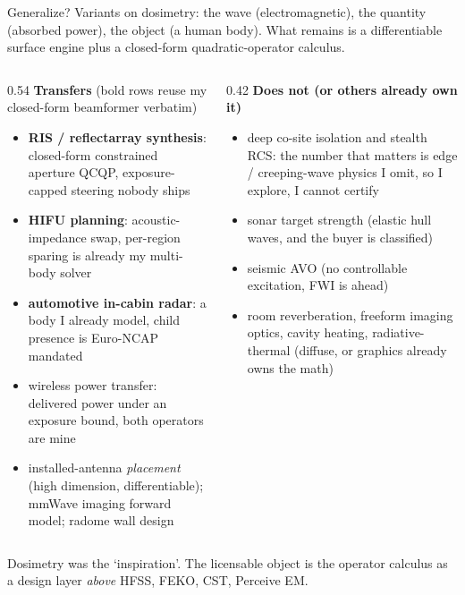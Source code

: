 \documentclass[aspectratio=169, 10pt]{beamer}
\begin{document}
\begin{frame}[t]{Generalize?}
  \vspace{2pt}
  {\footnotesize Variants on dosimetry: the wave (electromagnetic), the quantity (absorbed power), the object (a human body). What remains is a differentiable surface engine plus a closed-form quadratic-operator calculus.}
  \vspace{2pt}
  \begin{columns}[T]
    \begin{column}{0.54\textwidth}\scriptsize
      {\color{resultgreen}\textbf{Transfers}} {\color{darkgray}(bold rows reuse my closed-form beamformer verbatim)}
      \begin{itemize}\setlength\itemsep{0pt}
        \item \textbf{RIS / reflectarray synthesis}: closed-form constrained aperture QCQP, exposure-capped steering nobody ships
        \item \textbf{HIFU planning}: acoustic-impedance swap, per-region sparing is already my multi-body solver
        \item \textbf{automotive in-cabin radar}: a body I already model, child presence is Euro-NCAP mandated
        \item wireless power transfer: delivered power under an exposure bound, both operators are mine
        \item installed-antenna \emph{placement} (high dimension, differentiable); mmWave imaging forward model; radome wall design
      \end{itemize}
    \end{column}
    \begin{column}{0.42\textwidth}\scriptsize
      {\color{alertred}\textbf{Does not (or others already own it)}}
      \begin{itemize}\setlength\itemsep{0pt}
        \item deep co-site isolation and stealth RCS: the number that matters is edge / creeping-wave physics I omit, so I explore, I cannot certify
        \item sonar target strength (elastic hull waves, and the buyer is classified)
        \item seismic AVO (no controllable excitation, FWI is ahead)
        \item room reverberation, freeform imaging optics, cavity heating, radiative-thermal (diffuse, or graphics already owns the math)
      \end{itemize}
    \end{column}
  \end{columns}
  \vspace{4pt}
  \begin{resultbox}\centering\footnotesize
    Dosimetry was the `inspiration'. The licensable object is the operator calculus as a design layer \emph{above} HFSS, FEKO, CST, Perceive EM.
  \end{resultbox}
\end{frame}
\end{document}
